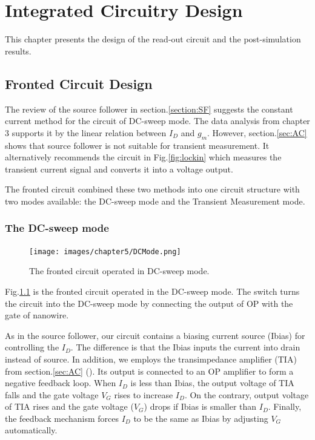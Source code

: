 \chapter{Integrated Circuitry Design}
This chapter presents the design of the read-out circuit and the post-simulation results.


\section{Fronted Circuit Design}
The review of the source follower in section.\ref{section:SF} suggests the constant current method for the circuit of DC-sweep mode.
The data analysis from chapter 3 supports it by the linear relation between $I_D$ and $g_m$.
However, section.\ref{sec:AC} shows that source follower is not suitable for transient measurement.
It alternatively recommends the circuit in Fig.\ref{fig:lockin} which measures the transient current signal and converts it into a voltage output.

The fronted circuit combined these two methods into one circuit structure with two modes available: the DC-sweep mode and the Transient Measurement mode.

\subsection{The DC-sweep mode}
\begin{figure}[!htbp]
    \centering
    \texttt{[image: images/chapter5/DCMode.png]}
    \caption{The fronted circuit operated in DC-sweep mode.}
    \label{fig:DCmode}
\end{figure}
Fig.\ref{fig:DCmode} is the fronted circuit operated in the DC-sweep mode.
The switch turns the circuit into the DC-sweep mode by connecting the output of OP with the gate of nanowire.

As in the source follower, our circuit contains a biasing current source (Ibias) for controlling the $I_D$.
The difference is that the Ibias inputs the current into drain instead of source.
In addition, we employs the transimpedance amplifier (TIA) from section.\ref{sec:AC} (\cite{Jlockin}).
Its output is connected to an OP amplifier to form a negative feedback loop.
When $I_D$ is less than Ibias, the output voltage of TIA falls and the gate voltage $V_G$ rises to increase $I_D$.
On the contrary, output voltage of TIA rises and the gate voltage ($V_G$) drops if Ibias is smaller than $I_D$.
Finally, the feedback mechanism forces $I_D$ to be the same as Ibias by adjusting $V_G$ automatically.


